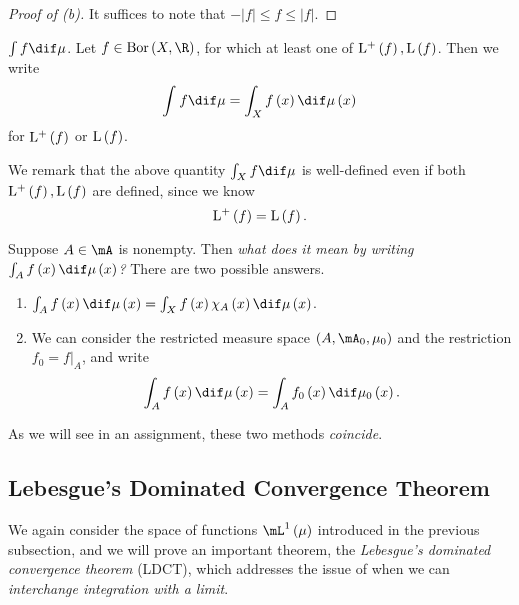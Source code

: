 \documentclass[pmath450]{subfiles}
\begin{document}
    \begin{proof}[Proof of (b)]
        It suffices to note that $-\left| f \right|\leq f\leq\left| f \right|$.
    \end{proof}

    \begin{notation}{$\int f\dif\mu$.}
        Let $f\in\bor\left( X,\R \right)$, for which at least one of $\operatorname{L^+}\left( f \right), \operatorname{L}\left( f \right)$. Then we write
        \begin{equation*}
            \int^{}f\dif\mu = \int^{}_{X}f\left( x \right)\dif\mu\left( x \right)
        \end{equation*}
        for $\operatorname{L^+}\left( f \right)$ or $\operatorname{L}\left( f \right)$.
    \end{notation}

    \np We remark that the above quantity $\int^{}_{X}f\dif\mu$ is well-defined even if both $\operatorname{L^+}\left( f \right),\operatorname{L}\left( f \right)$ are defined, since we know 
    \begin{equation*}
        \operatorname{L^+}\left( f \right) = \operatorname{L}\left( f \right).
    \end{equation*}

    \np Suppose $A\in\mA$ is nonempty. Then \textit{what does it mean by writing $\int^{}_{A}f\left( x \right)\dif\mu\left( x \right)$?} There are two possible answers.
    \begin{enumerate}
        \item $\int^{}_{A}f\left( x \right)\dif\mu\left( x \right) = \int^{}_{X}f\left( x \right)\chi_A\left( x \right)\dif\mu\left( x \right)$.
        \item We can consider the restricted measure space $\left( A,\mA_0,\mu_0 \right)$ and the restriction $f_0=f|_A$, and write
            \begin{equation*}
                \int^{}_{A}f\left( x \right)\dif\mu\left( x \right) = \int^{}_{A}f_0\left( x \right)\dif\mu_0\left( x \right).
            \end{equation*}
    \end{enumerate}
    As we will see in an assignment, these two methods \textit{coincide}.

    \subsection{Lebesgue's Dominated Convergence Theorem}

    We again consider the space of functions $\lone\left( \mu \right)$ introduced in the previous subsection, and we will prove an important theorem, the \textit{Lebesgue's dominated convergence theorem} (LDCT), which addresses the issue of when we can \textit{interchange integration with a limit}. 
\end{document}
